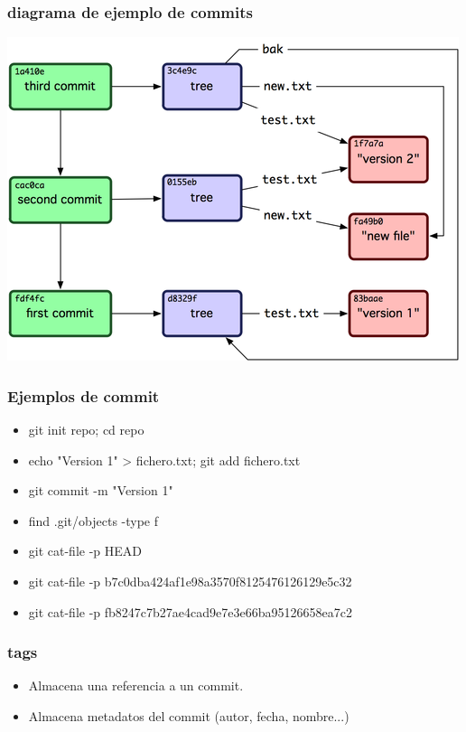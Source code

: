 \documentclass[10pt]{beamer}
\begin{document}
  \begin{frame}
    \frametitle{diagrama de ejemplo de commits}
    \begin{center}\includegraphics{commits.png}\end{center}
  \end{frame}

  \begin{frame}
    \frametitle{Ejemplos de commit}
    \begin{itemize}
        \item git init repo; cd repo
        \item echo "Version 1" > fichero.txt; git add fichero.txt
        \item git commit -m "Version 1"
        \item find .git/objects -type f
        \item git cat-file -p HEAD
        \item git cat-file -p b7c0dba424af1e98a3570f8125476126129e5c32
        \item git cat-file -p fb8247c7b27ae4cad9e7e3e66ba95126658ea7c2
    \end{itemize}
  \end{frame}

  \begin{frame}
    \frametitle{tags}
    \begin{itemize}
        \item Almacena una referencia a un commit.
        \item Almacena metadatos del commit (autor, fecha, nombre...)
    \end{itemize}
  \end{frame}
\end{document}
